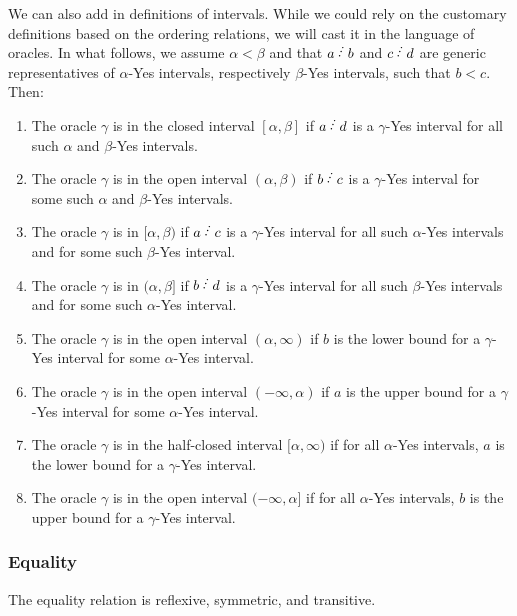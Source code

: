 \documentclass[12pt]{article}
\begin{document}
We can also add in definitions of intervals. While we could rely on the customary definitions based on the ordering relations, we will cast it in the language of oracles. In what follows, we assume $\alpha < \beta$ and that $a\lte b$ and $c\lte d$ are generic representatives of $\alpha$-Yes intervals, respectively $\beta$-Yes intervals, such that $b < c$. Then: 

\begin{enumerate}
\item The oracle $\gamma$ is in the closed interval $[\alpha, \beta]$ if $a \lte  d$ is a $\gamma$-Yes interval for all such $\alpha$ and $\beta$-Yes intervals. 
\item The oracle $\gamma$ is in the open interval $(\alpha, \beta)$ if $b\lte c$ is a $\gamma$-Yes interval for some such $\alpha$ and $\beta$-Yes intervals. 
\item The oracle $\gamma$ is in $[\alpha, \beta)$ if $a\lte c$ is a $\gamma$-Yes interval for all such $\alpha$-Yes intervals and for some such $\beta$-Yes interval.
\item The oracle $\gamma$ is in $(\alpha, \beta]$ if $b\lte d$ is a $\gamma$-Yes interval for all such $\beta$-Yes intervals and for some such $\alpha$-Yes interval.
\item The oracle $\gamma$ is in the open interval $(\alpha, \infty)$ if $b$ is the lower bound for a $\gamma$-Yes interval for some $\alpha$-Yes interval. 
\item The oracle $\gamma$ is in the open interval $(-\infty, \alpha)$ if $a$ is the upper bound for a $\gamma$-Yes interval for some $\alpha$-Yes interval. 
\item The oracle $\gamma$ is in the half-closed interval $[\alpha, \infty)$ if for all $\alpha$-Yes intervals, $a$ is the lower bound for a $\gamma$-Yes interval. 
\item The oracle $\gamma$ is in the open interval $(-\infty, \alpha]$ if for all $\alpha$-Yes intervals, $b$ is the upper bound for a $\gamma$-Yes interval. 
\end{enumerate}



\subsubsection{Equality}\label{sec:eq}

\begin{proposition}\label{pr:reflexive}
The equality relation is reflexive, symmetric, and transitive. 
\end{proposition}
\end{document}

